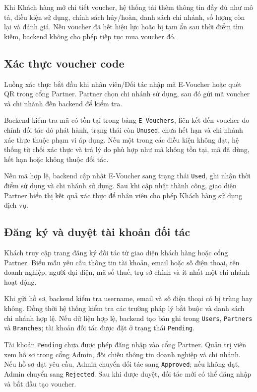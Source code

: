 Khi Khách hàng mở chi tiết voucher, hệ thống tải thêm thông tin đầy đủ như mô tả, điều kiện sử dụng, chính sách hủy/hoàn, danh sách chi nhánh, số lượng còn lại và đánh giá. Nếu voucher đã hết hiệu lực hoặc bị tạm ẩn sau thời điểm tìm kiếm, backend không cho phép tiếp tục mua voucher đó.

\subsection{Xác thực voucher code}

Luồng xác thực bắt đầu khi nhân viên/Đối tác nhập mã E-Voucher hoặc quét QR trong cổng Partner. Partner chọn chi nhánh sử dụng, sau đó gửi mã voucher và chi nhánh đến backend để kiểm tra.

Backend kiểm tra mã có tồn tại trong bảng \texttt{E\_Vouchers}, liên kết đến voucher do chính đối tác đó phát hành, trạng thái còn \texttt{Unused}, chưa hết hạn và chi nhánh xác thực thuộc phạm vi áp dụng. Nếu một trong các điều kiện không đạt, hệ thống từ chối xác thực và trả lý do phù hợp như mã không tồn tại, mã đã dùng, hết hạn hoặc không thuộc đối tác.

Nếu mã hợp lệ, backend cập nhật E-Voucher sang trạng thái \texttt{Used}, ghi nhận thời điểm sử dụng và chi nhánh sử dụng. Sau khi cập nhật thành công, giao diện Partner hiển thị kết quả xác thực để nhân viên cho phép Khách hàng sử dụng dịch vụ.

\subsection{Đăng ký và duyệt tài khoản đối tác}

Khách truy cập trang đăng ký đối tác từ giao diện khách hàng hoặc cổng Partner. Biểu mẫu yêu cầu thông tin tài khoản, email hoặc số điện thoại, tên doanh nghiệp, người đại diện, mã số thuế, trụ sở chính và ít nhất một chi nhánh hoạt động.

Khi gửi hồ sơ, backend kiểm tra username, email và số điện thoại có bị trùng hay không. Đồng thời hệ thống kiểm tra các trường pháp lý bắt buộc và danh sách chi nhánh hợp lệ. Nếu dữ liệu hợp lệ, backend tạo bản ghi trong \texttt{Users}, \texttt{Partners} và \texttt{Branches}; tài khoản đối tác được đặt ở trạng thái \texttt{Pending}.

Tài khoản \texttt{Pending} chưa được phép đăng nhập vào cổng Partner. Quản trị viên xem hồ sơ trong cổng Admin, đối chiếu thông tin doanh nghiệp và chi nhánh. Nếu hồ sơ đạt yêu cầu, Admin chuyển đối tác sang \texttt{Approved}; nếu không đạt, Admin chuyển sang \texttt{Rejected}. Sau khi được duyệt, đối tác mới có thể đăng nhập và bắt đầu tạo voucher.

